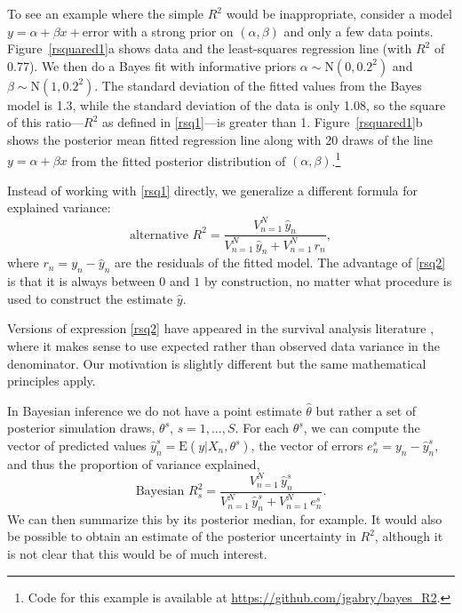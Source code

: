 \documentclass[11pt]{article}
\begin{document}
To see an example where the simple $R^2$ would be inappropriate, consider a model
$y = \alpha + \beta x+\mbox{error}$
with a strong prior on $(\alpha,\beta)$ and only a few data points.
Figure~\ref{rsquared1}a shows data and the least-squares regression line (with
$R^2$ of 0.77).  We then do a Bayes fit with informative priors
$\alpha \sim \mbox{N}(0,0.2^2)$ and $\beta \sim \mbox{N}(1,0.2^2)$.
The standard deviation of the fitted values from the Bayes model is 1.3, while
the standard deviation of the data is only 1.08, so the square of this
ratio---$R^2$ as defined in \eqref{rsq1}---is greater than 1.
Figure~\ref{rsquared1}b shows the posterior mean fitted regression line along
with 20 draws of the line $y = \alpha + \beta x$ from the fitted posterior
distribution of $(\alpha,\beta)$.\footnote{Code for this example is available at
\url{https://github.com/jgabry/bayes_R2}.}

Instead of working with \eqref{rsq1} directly, we generalize a different formula
for explained variance:
%
\begin{equation}\label{rsq2}
\mbox{alternative } R^2 = 
	\frac{V_{n=1}^N \,\hat{y}_n}{V_{n=1}^N \,\hat{y}_n  + V_{n=1}^N \,r_n},
\end{equation}
%
where $r_n = y_n - \hat{y}_n$ are the residuals of the fitted model.
The advantage of \eqref{rsq2} is that it is always between $0$ and $1$ by
construction, no matter what procedure is used to construct the estimate
$\hat{y}$.

Versions of expression \eqref{rsq2} have appeared in the survival analysis
literature \citep{KentOquigley1988, ChoodariRoystonParmar2010},
where it makes sense to use expected rather than observed data variance
in the denominator.  Our motivation is slightly different but the same
mathematical principles apply.

In Bayesian inference we do not have a point estimate $\hat{\theta}$ but rather
a set of posterior simulation draws, $\theta^s, \,s=1,\ldots,S$.
For each $\theta^s$, we can compute the vector of predicted values
$\hat{y}_n^s = \mbox{E}(y | X_n, \theta^s)$, the vector of errors
$e_n^s = y_n - \hat{y}_n^s$, and thus the proportion of variance explained,
%
\begin{equation}\label{rsq3}
\mbox{Bayesian } R^2_s = 
	\frac{V_{n=1}^N \,\hat{y}_n^s}{V_{n=1}^N \,\hat{y}_n^s  + V_{n=1}^N \,e_n^s}.
\end{equation}
%
We can then summarize this by its posterior median, for example. It would also
be possible to obtain an estimate of the posterior uncertainty in $R^2$,
although it is not clear that this would be of much interest.
\end{document}
